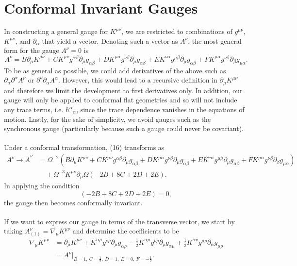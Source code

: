 \documentclass[10pt,letterpaper]{article}
\begin{document}
\section*{Conformal Invariant Gauges}
In constructing a general gauge for $K^{\mu\nu}$, we are restricted to combinations of $g^{\mu\nu}$, $K^{\mu\nu}$, and $\partial_\alpha$ that yield a vector. Denoting such a vector as $A^\nu$, the most general form for the gauge $A^\nu = 0$ is
\begin{equation}
 A^\nu = B\partial_\mu K^{\mu\nu}+ CK^{\mu\nu} g^{\alpha\beta}\partial_\mu g_{\alpha\beta} +D K^{\mu\alpha}g^{\nu\beta}\partial_{\mu}g_{\alpha\beta}+EK^{\nu\alpha}g^{\mu\beta}\partial_\mu g_{\alpha\beta}+FK^{\mu\alpha}g^{\nu\beta}\partial_\beta g_{\mu\alpha}.
\end{equation}
 To be as general as possible, we could add derivatives of the above such as $\partial_\alpha\partial^\alpha A^{\nu}$ or $\partial^\nu \partial_\alpha A^\alpha$. However,  this would lead to a recursive definition in $\partial_\mu K^{\mu\nu}$ and therefore we limit the development to first derivatives only. In addition, our gauge will only be applied to conformal flat geometries and so will not include any trace terms, i.e. $h^\alpha{}_\alpha$, since the trace dependence vanishes in the equations of motion. Lastly, for the sake of simplicity, we avoid gauges such as the synchronous gauge (particularly because such a gauge could never be covariant).\\ \\
Under a conformal transformation, (16) transforms as
\begin{align}
 A^\nu \to \bar A^\nu &= \Omega^{-2}(B\partial_\mu K^{\mu\nu}+ CK^{\mu\nu} g^{\alpha\beta}\partial_\mu g_{\alpha\beta} + D K^{\mu\alpha}g^{\nu\beta}\partial_{\mu}g_{\alpha\beta}+EK^{\nu\alpha}g^{\mu\beta}\partial_\mu g_{\alpha\beta}+FK^{\mu\alpha}g^{\nu\beta}\partial_\beta g_{\mu\alpha})\nonumber \\
 &\quad + \Omega^{-3}K^{\mu\nu}\partial_\mu \Omega ( -2B + 8C +2D +2E).
\end{align}
In applying the condition
\begin{equation}
(-2B+8C+2D+2E) = 0,
\end{equation}
the gauge then becomes conformally invariant. 
\\ \\
If we want to express our gauge in terms of the transverse vector, we start by taking $A^\nu_{(1)}= \nabla_\mu K^{\mu\nu}$ and determine the coefficients to be
\begin{align}
\nabla_\mu K^{\mu\nu} &=\partial_\mu K^{\mu\nu} + K^{\alpha\mu} g^{\nu\rho} \partial_\mu g_{\alpha\rho} - \frac12 K^{\alpha\mu} g^{\nu\rho}\partial_\rho g_{\alpha\mu}
+ \frac12 K^{\alpha\nu} g^{\mu\rho}\partial_\alpha g_{\mu\rho}\nonumber \\
&= A^{\nu}\bigg|_{B=1,\ C=\tfrac12,\ D=1,\ E=0,\ F = -\tfrac12}.
\end{align}
\end{document}
